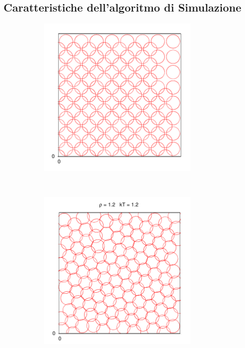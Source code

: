 \documentclass[11pt]{article}
\theoremstyle{plain}
\theoremstyle{remark}
\begin{document}
\subsection{Caratteristiche dell'algoritmo di Simulazione}
\begin{figure}
		\caption[Sfere Soffici$/$Preliminari\_Snap2D.cpp]{Immagini del sistema 2D termalizzato a diversi valori di densità e Temperatura (In alto a sinistra è visibile la configurazione inziale prima dell'evoluzione temporale).}
        \begin{subfigure}[b]{0.5\textwidth}
                \centering
                \includegraphics[width=0.85\textwidth]{Immagini/Soffici/SnapSolidoCompresso_Inizio_2D}
        \end{subfigure}%
        ~ %
        \begin{subfigure}[b]{0.5\textwidth}
                \centering
                \includegraphics[width=0.85\textwidth]{Immagini/Soffici/SnapSolidoCompresso_2D}

\end{subfigure}
\end{figure}
\end{document}
